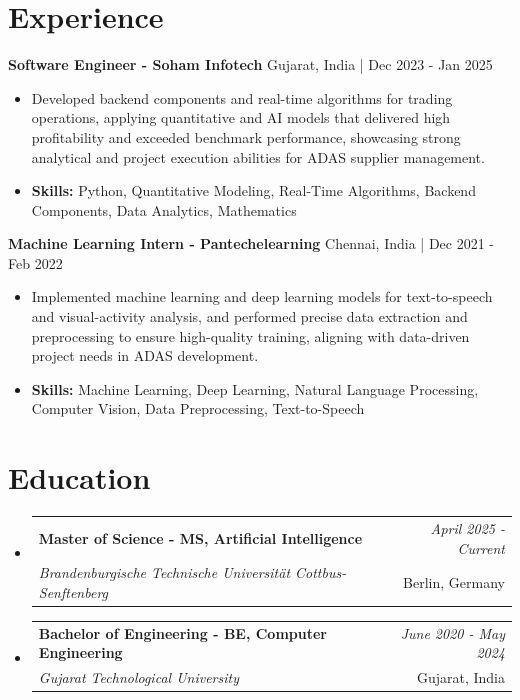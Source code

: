 \documentclass[a4paper,11pt]{article}
\makeatletter
\newcommand{\resumeSubheading}[4]{
\vspace{0.5mm}\item
    \begin{tabular*}{\linewidth}[t]{l@{\extracolsep{\fill}}r}
        \textbf{#1} & \textit{\footnotesize{#4}} \\
        \textit{\footnotesize{#3}} &  \footnotesize{#2}\\
    \end{tabular*}
    \vspace{-2.4mm}
}
\makeatother
\begin{document}
\section{\textbf{Experience}}


\vspace{1mm}
  \textbf{Software Engineer - Soham Infotech} \hfill Gujarat, India | Dec 2023 - Jan 2025
\vspace{-1.5mm} %
\begin{itemize}
  \item Developed backend components and real-time algorithms for trading operations, applying quantitative and AI models that delivered high profitability and exceeded benchmark performance, showcasing strong analytical and project execution abilities for ADAS supplier management.

\vspace{-2mm}
  \item \textbf{Skills:} Python, Quantitative Modeling, Real-Time Algorithms, Backend Components, Data Analytics, Mathematics
\end{itemize}

\vspace{1mm}
  \textbf{Machine Learning Intern - Pantechelearning} \hfill Chennai, India | Dec 2021 - Feb 2022
\vspace{-1.5mm} %
\begin{itemize}
  \item Implemented machine learning and deep learning models for text-to-speech and visual-activity analysis, and performed precise data extraction and preprocessing to ensure high-quality training, aligning with data-driven project needs in ADAS development.
\vspace{-2mm}
  \item \textbf{Skills:} Machine Learning, Deep Learning, Natural Language Processing, Computer Vision, Data Preprocessing, Text-to-Speech
\end{itemize}\section{\textbf{Education}}
\vspace{-0.4mm}

\begin{itemize}[leftmargin=0.15in, label={}]
\resumeSubheading
{Master of Science - MS, Artificial Intelligence }{Berlin, Germany}
{Brandenburgische Technische Universität Cottbus-Senftenberg  }{April 2025 - Current}

\vspace{1.0mm} %
\resumeSubheading
{Bachelor of Engineering - BE, Computer Engineering  }{Gujarat, India}
{Gujarat Technological University }{June 2020 - May 2024}

\end{itemize}
\end{document}
